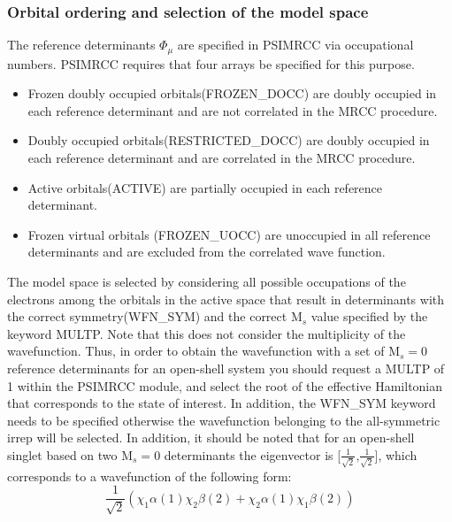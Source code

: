 \subsubsection{Orbital ordering and selection of the model space}
The reference determinants $\Phi_\mu$ are specified in PSIMRCC via occupational numbers. PSIMRCC requires that four arrays be specified for this purpose.

\begin{itemize}
\item Frozen doubly occupied orbitals(FROZEN\_DOCC) are doubly occupied in each reference determinant and are not correlated in the MRCC procedure.
\item Doubly occupied orbitals(RESTRICTED\_DOCC)  are doubly occupied in each reference determinant and are correlated in the MRCC procedure.
\item Active orbitals(ACTIVE) are partially occupied in each reference determinant.
\item Frozen virtual orbitals (FROZEN\_UOCC) are unoccupied in all reference determinants and are excluded from the correlated wave function.
\end{itemize} 

The model space is selected by considering all possible occupations of the electrons among the orbitals in the active space that result in determinants with the correct symmetry(WFN\_SYM) and the correct $\textrm{M}_s$ value specified by the keyword MULTP. Note that this does not consider the multiplicity of the wavefunction. Thus, in order to obtain the wavefunction with a set of $\textrm{M}_s = 0$ reference determinants for an open-shell system you should request a MULTP of 1 within the PSIMRCC module, and select the root of the effective Hamiltonian that corresponds to the state of interest. In addition, the WFN\_SYM keyword needs to be specified otherwise the wavefunction belonging to the all-symmetric irrep will be selected. In addition, it should be noted that for an open-shell singlet based on two $\textrm{M}_s = 0$ determinants the eigenvector is [$\frac{1}{\sqrt{2}}\text{,}\frac{1}{\sqrt{2}}$], which corresponds to a wavefunction of the following form:
\begin{equation*}
\frac{1}{\sqrt{2}} \left( \chi_1 \alpha (1) \chi_2 \beta (2) + \chi_2 \alpha(1) \chi_1 \beta (2) \right)
\end{equation*}  

